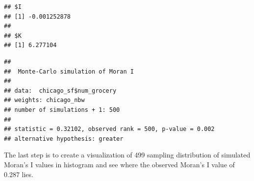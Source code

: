 \documentclass[
]{article}
\newenvironment{Shaded}{\begin{snugshade}}{\end{snugshade}}
\newcommand{\AttributeTok}[1]{\textcolor[rgb]{0.13,0.29,0.53}{#1}}
\newcommand{\CommentTok}[1]{\textcolor[rgb]{0.56,0.35,0.01}{\textit{#1}}}
\newcommand{\ConstantTok}[1]{\textcolor[rgb]{0.56,0.35,0.01}{#1}}
\newcommand{\DecValTok}[1]{\textcolor[rgb]{0.00,0.00,0.81}{#1}}
\newcommand{\FunctionTok}[1]{\textcolor[rgb]{0.13,0.29,0.53}{\textbf{#1}}}
\newcommand{\NormalTok}[1]{#1}
\newcommand{\SpecialCharTok}[1]{\textcolor[rgb]{0.81,0.36,0.00}{\textbf{#1}}}
\begin{document}
\begin{verbatim}
## $I
## [1] -0.001252878
## 
## $K
## [1] 6.277104
\end{verbatim}

\begin{Shaded}
\end{Shaded}

\begin{verbatim}
## 
##  Monte-Carlo simulation of Moran I
## 
## data:  chicago_sf$num_grocery 
## weights: chicago_nbw  
## number of simulations + 1: 500 
## 
## statistic = 0.32102, observed rank = 500, p-value = 0.002
## alternative hypothesis: greater
\end{verbatim}

The last step is to create a visualization of 499 sampling distribution
of simulated Moran's I values in histogram and see where the observed
Moran's I value of 0.287 lies.
\end{document}
